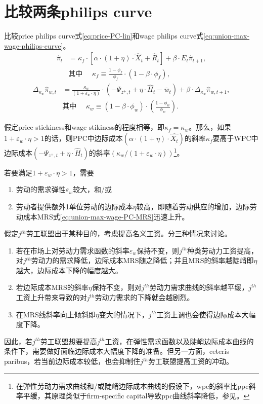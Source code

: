 \section{比较两条philips curve}
\label{sec:price-PC-wage-PC-comp}
比较price philips curve式\eqref{eq:price-PC-lin}和wage philips curve式\eqref{eq:union-max-wage-philips-curve}。
\begin{equation*}
\begin{split}
\hat{\pi}_t &= \kappa_f \cdot \left[\alpha \cdot \left(1+\eta\right) \cdot \hat{X}_t + \hat{R}_t\right] + \beta \cdot E_t \hat{\pi}_{t+1},\\
&\text{其中 } \quad \kappa_f \equiv \frac{1-\phi_f}{\phi_f} \cdot \left(1-\beta \cdot \phi_f \right),
\end{split}
\end{equation*}
\begin{equation*}
\begin{split}
  \Delta_{\kappa_w} \hat{\pi}_{w,t}  &= \frac{\kappa_w}{\left(1+\varepsilon_w \cdot \eta \right)} \cdot \left(-\Psi_{z^+,t} + \eta \cdot \hat{H}_t - \bar{w}_t\right) + \beta \cdot \Delta_{\kappa_w} \hat{\pi}_{w,t+1},\\
&\text{其中 } \quad  \kappa_w \equiv  \left(1-\beta \cdot \phi_w \right) \cdot \left(\frac{1-\phi_w}{\phi_w}\right).
\end{split}
\end{equation*}

假定price stickiness和wage stikiness的程度相等，即$\kappa_f = \kappa_w$。那么，如果$1+\varepsilon_w \cdot \eta > 1$的话，则PPC中边际成本$\left(\alpha \cdot (1+\eta) \cdot \hat{X_t}\right)$的斜率$\kappa_f$要高于WPC中边际成本$\left(-\Psi_{z^+,t}+\eta \cdot \hat{H}_t\right)$的斜率$\left(\kappa_w / \left( 1+\varepsilon_w \cdot \eta \right)\right)$\footnote{在弹性劳动力需求曲线和/或陡峭边际成本曲线的假设下，wpc的斜率比ppc斜率平缓，其原理类似于firm-specific capital导致ppc曲线斜率降低，参见\cite{Sveen:2005db, Altig:2011eu, DeWalque:2006wf}。}。

若要满足$1+\varepsilon_w \cdot \eta > 1$，需要
\begin{enumerate}
\item 劳动的需求弹性$\varepsilon_w$较大，和/或
\item 劳动者提供额外1单位劳动的边际成本$\eta$较高，即随着劳动供应的增加，边际劳动成本MRS式\eqref{eq:union-max-wage-PC-MRS}迅速上升。
\end{enumerate}

假定$j^{th}$劳工联盟出于某种目的，考虑提高名义工资。分三种情况来讨论。
\begin{enumerate}
\item 若在市场上对劳动力需求函数的斜率$\varepsilon_w$保持不变，则$j^{th}$种类劳动力工资提高，对$j^{th}$劳动力的需求降低，边际成本MRS随之降低；并且MRS的斜率越陡峭即$\eta$越大，边际成本下降的幅度越大。
\item 若边际成本MRS的斜率$\eta$保持不变，则对$j^{th}$劳动力需求曲线的斜率越平缓，$j^{th}$工资上升带来导致的对$j^{th}$劳动力需求的下降就会越剧烈。
\item 在MRS线斜率向上倾斜即$\eta$变大的情况下，$j^{th}$工资上调也会使得边际成本大幅度下降。
\end{enumerate}

因此，若$j^{th}$劳工联盟想要提高$j^{th}$工资，在弹性需求函数以及陡峭边际成本曲线的条件下，需要做好面临边际成本大幅度下降的准备。但另一方面，ceteris paribus，若当前边际成本较低，也会抑制住$j^{th}$劳工联盟提高工资的冲动。
